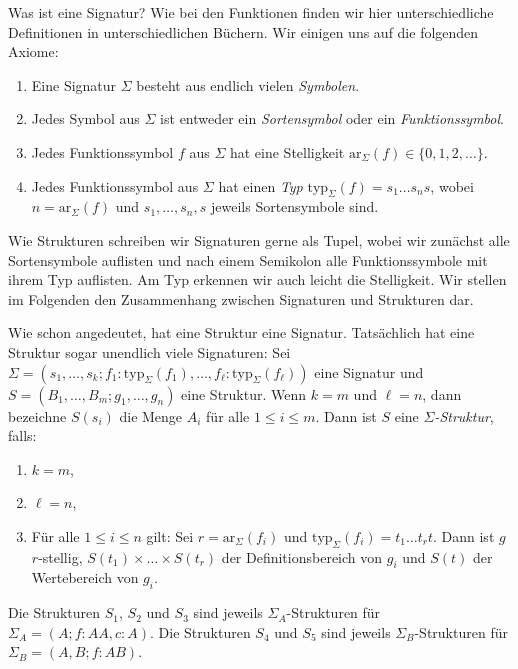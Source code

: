 \documentclass{article}
\begin{document}
Was ist eine Signatur? Wie bei den Funktionen finden wir hier unterschiedliche 
Definitionen in unterschiedlichen Büchern. Wir einigen uns auf die folgenden 
Axiome: 
\begin{enumerate}
 \item Eine Signatur $\Sigma$ besteht aus endlich vielen \emph{Symbolen}. 
 \item Jedes Symbol aus $\Sigma$ ist entweder ein \emph{Sortensymbol} oder ein 
\emph{Funktionssymbol}.
 \item Jedes Funktionssymbol $f$ aus $\Sigma$ hat eine Stelligkeit 
$\mathrm{ar}_\Sigma(f)\in\{0,1,2,\ldots\}$. 
 \item Jedes Funktionssymbol aus $\Sigma$ hat einen \emph{Typ} 
$\mathrm{typ}_\Sigma(f) = s_1\ldots s_n s$, wobei 
$n = \mathrm{ar}_\Sigma(f)$ und $s_1,\ldots,s_n,s$ jeweils Sortensymbole sind. 
\end{enumerate}

Wie Strukturen schreiben wir Signaturen gerne als Tupel, wobei wir zunächst 
alle Sortensymbole auflisten und nach einem Semikolon alle Funktionssymbole mit 
ihrem Typ auflisten. Am Typ erkennen wir auch leicht die Stelligkeit. Wir 
stellen im Folgenden den Zusammenhang zwischen Signaturen und Strukturen dar. 

Wie schon angedeutet, hat eine Struktur eine Signatur. Tatsächlich hat eine 
Struktur sogar unendlich viele Signaturen: Sei $\Sigma = 
(s_1,\ldots,s_k;f_1:\mathrm{typ}_\Sigma(f_1),\ldots,
f_\ell:\mathrm{typ}_\Sigma(f_\ell))$ eine Signatur
und $S = 
(B_1,\ldots,B_m;g_1,\ldots,g_n)$ eine Struktur. Wenn $k = m$ und $\ell = n$, 
dann bezeichne $S(s_i)$ die Menge $A_i$ für alle $1\leq i\leq m$. Dann ist $S$ 
eine \emph{$\Sigma$-Struktur}, falls: 
\begin{enumerate}
 \item $k = m$, 
 \item $\ell = n$,
 \item Für alle $1\leq i\leq n$ gilt: Sei $r = \mathrm{ar}_\Sigma(f_i)$ und  
$\mathrm{typ}_\Sigma(f_i) = t_1\ldots t_r t$. Dann ist $g$ $r$-stellig, 
$S(t_1)\times\ldots\times S(t_r)$ der Definitionsbereich von $g_i$ und $S(t)$ 
der Wertebereich von $g_i$. 
\end{enumerate}
Die Strukturen $S_1$, $S_2$ und $S_3$ sind jeweils $\Sigma_A$-Strukturen für 
$\Sigma_A =  (A;f:AA,c:A)$. Die Strukturen $S_4$ und $S_5$ sind jeweils 
$\Sigma_B$-Strukturen für $\Sigma_B = (A,B;f:AB)$. 












 
\end{document}
